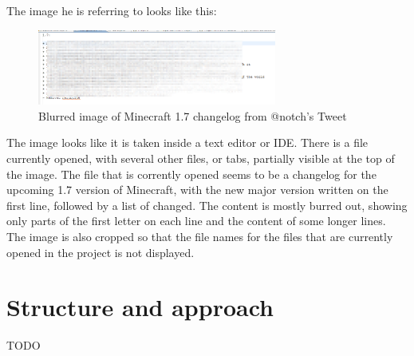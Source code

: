 The image he is referring to looks like this:

\begin{figure}[h]
    \centering
    \includegraphics[width=0.7\textwidth]{fig/chapter1/notch_eclipse.png}
    \caption{Blurred image of Minecraft 1.7 changelog from @notch's Tweet}
\end{figure}

The image looks like it is taken inside a text editor or \gls{IDE}. There is a file currently opened, with several other files, or tabs, partially visible at the top of the image. The file that is corrently opened seems to be a changelog for the upcoming 1.7 version of Minecraft, with the new major version written on the first line, followed by a list of changed. The content is mostly burred out, showing only parts of the first letter on each line and the content of some longer lines. The image is also cropped so that the file names for the files that are currently opened in the project is not displayed.

\section{Structure and approach}
TODO